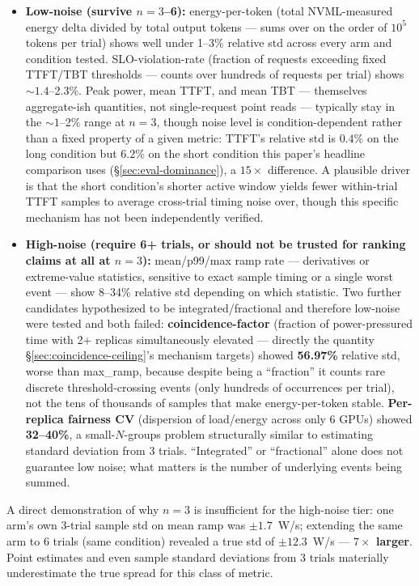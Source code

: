 \documentclass[sigconf,review,anonymous]{acmart}
\begin{document}
\begin{itemize}
  \item \textbf{Low-noise (survive $n{=}3$--6):} energy-per-token (total NVML-measured energy
    delta divided by total output tokens --- sums over on the order of $10^5$ tokens per
    trial) shows well under 1--3\% relative std across every arm and condition tested.
    SLO-violation-rate (fraction of requests exceeding fixed TTFT/TBT thresholds --- counts
    over hundreds of requests per trial) shows ${\sim}1.4$--2.3\%. Peak power, mean TTFT, and
    mean TBT --- themselves aggregate-ish quantities, not single-request point reads ---
    typically stay in the ${\sim}1$--2\% range at $n{=}3$, though noise level is
    condition-dependent rather than a fixed property of a given metric: TTFT's relative std is
    $0.4\%$ on the long condition but $6.2\%$ on the short condition this paper's headline
    comparison uses (\S\ref{sec:eval-dominance}), a $15\times$ difference. A plausible driver
    is that the short condition's shorter active window yields fewer within-trial TTFT samples
    to average cross-trial timing noise over, though this specific mechanism has not been
    independently verified.
  \item \textbf{High-noise (require 6+ trials, or should not be trusted for ranking claims at
    all at $n{=}3$):} mean/p99/max ramp rate --- derivatives or extreme-value statistics,
    sensitive to exact sample timing or a single worst event --- show 8--34\% relative std
    depending on which statistic. Two further candidates hypothesized to be
    integrated/fractional and therefore low-noise were tested and both failed:
    \textbf{coincidence-factor}
    (fraction of power-pressured time with 2+ replicas simultaneously elevated --- directly
    the quantity \S\ref{sec:coincidence-ceiling}'s mechanism targets) showed \textbf{56.97\%}
    relative std, worse than max\_ramp, because despite being a ``fraction'' it counts rare
    discrete threshold-crossing events (only hundreds of occurrences per trial), not the tens
    of thousands of samples that make energy-per-token stable. \textbf{Per-replica fairness
    CV} (dispersion of load/energy across only 6 GPUs) showed \textbf{32--40\%}, a
    small-$N$-groups problem structurally similar to estimating standard deviation from 3
    trials. ``Integrated'' or ``fractional'' alone does not guarantee low noise; what matters
    is the number of underlying events being summed.
\end{itemize}

A direct demonstration of why $n{=}3$ is insufficient for the high-noise tier: one arm's own
3-trial sample std on mean ramp was $\pm 1.7$~W/s; extending the same arm to 6 trials (same
condition) revealed a true std of $\pm 12.3$~W/s --- \textbf{$7\times$ larger}. Point estimates
and even sample standard deviations from 3 trials materially underestimate the true spread
for this class of metric.
\end{document}
